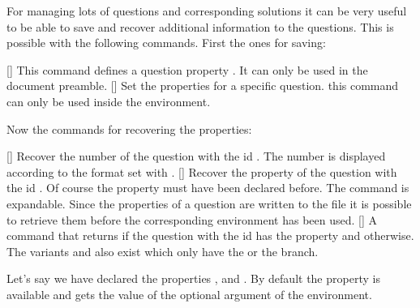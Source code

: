 \documentclass[load-preamble+,scrartcl={DIV10}]{cnltx-doc}
\begin{document}
For managing lots of questions and corresponding solutions it can be very
useful to be able to save and recover additional information to the questions.
This is possible with the following commands.  First the ones for saving:
\begin{commands}
  []
    This command defines a question property .  It can only be
    used in the document preamble.
  []
    Set the properties for a specific question. this command can only be used
    inside the  environment.
\end{commands}
Now the commands for recovering the properties:
\begin{commands}
  []
    Recover the number of the question with the \acs{id} .  The
    number is displayed according to the format set with
    .
  \expandable{}[]
    Recover the property  of the question with the \acs{id}
    .  Of course the property must have been declared before.  The
    command is expandable.  Since the properties of a
    question are written to the  file it is possible to retrieve
    them before the corresponding  environment has been used.
  \expandable{}[]
    A command that returns  if the question with
    the \acs{id}  has the property  and 
    otherwise.  The variants  and
     also exist which only have the  or the
     branch.
\end{commands}
  
Let's say we have declared the properties ,  and
.  By default the property  is available and gets the
value of the optional argument of the  environment.
\end{document}
